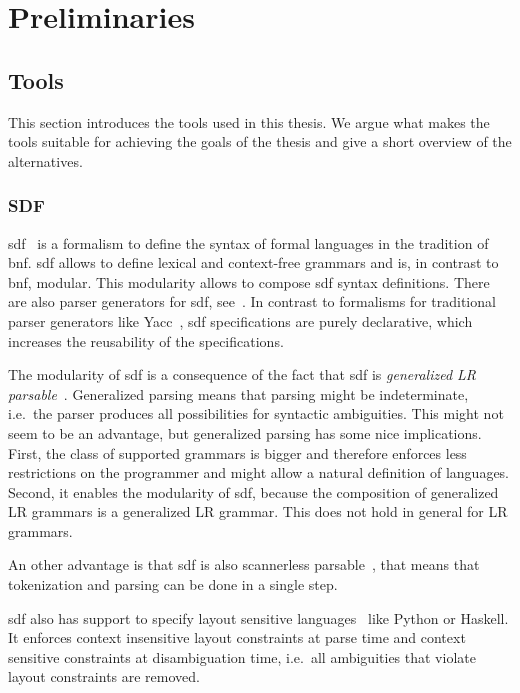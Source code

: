 \chapter{Preliminaries}
\section{Tools}
This section introduces the tools used in this thesis. We argue what
makes the tools suitable for achieving the goals of the thesis and
give a short overview of the alternatives.

\subsection{SDF}
\gls{sdf}~\cite{Heering:1989:SDF:71605.71607} is a formalism to define
the syntax of formal languages in the tradition of
\gls{bnf}. \gls{sdf} allows to define lexical and context-free
grammars and is, in contrast to \gls{bnf}, modular. This modularity
allows to compose \gls{sdf} syntax definitions. There are also parser
generators for \gls{sdf}, see~\cite{Rekers92parsergeneration}. In
contrast to formalisms for traditional parser generators like
Yacc~\cite{Johnson75yacc:yet}, \gls{sdf} specifications are purely
declarative, which increases the reusability of the specifications.

The modularity of \gls{sdf} is a consequence of the fact that
\gls{sdf} is \textit{generalized LR
  parsable}~\cite{Rekers92parsergeneration}. Generalized parsing means
that parsing might be indeterminate, i.e.\ the parser produces all
possibilities for syntactic ambiguities. This might not seem to be an
advantage, but generalized parsing has some nice implications. First,
the class of supported grammars is bigger and therefore enforces less
restrictions on the programmer and might allow a natural definition of
languages. Second, it enables the modularity of \gls{sdf}, because the
composition of generalized LR grammars is a generalized LR
grammar. This does not hold in general for LR grammars.

An other advantage is that \gls{sdf} is also scannerless
parsable~\cite{Brand02disambiguationfilters}, that means that
tokenization and parsing can be done in a single step.

\gls{sdf} also has support to specify layout sensitive
languages~\cite{conf/sle/ErdwegRKO12} like Python or Haskell. It
enforces context insensitive layout constraints at parse time and
context sensitive constraints at disambiguation time, i.e.\ all
ambiguities that violate layout constraints are removed.


